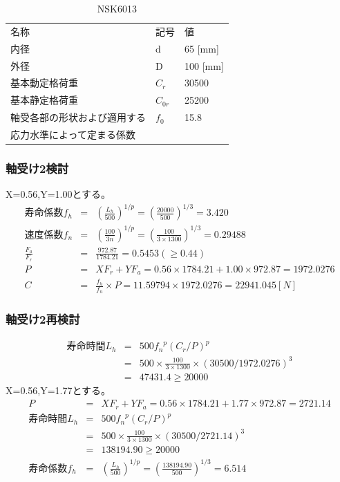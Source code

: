 \documentclass[a4j,twoside,openright,11pt]{jreport}
\begin{document}
\begin{table}[htb]
\begin{center}
  \caption{NSK6013}
  \begin{tabular}{lll} \hline
名称&記号&値\\
内径& d &65 [mm]\\
外径& D &100 [mm]\\
基本動定格荷重&$C_{r}$&30500\\
基本静定格荷重&$C_{0r}$&25200\\
軸受各部の形状および適用する&$f_0$&15.8\\
応力水準によって定まる係数&&\\
\hline
  \end{tabular}
\end{center}
\end{table}


\subsubsection{軸受け2検討}
X=0.56,Y=1.00とする。
\begin{eqnarray}
寿命係数f_h &=& \left( \frac{L_h}{500} \right)^{1/p} = \left( \frac{20000}{500} \right)^{1/3} = 3.420\\
速度係数f_n &=& \left( \frac{100}{3n} \right)^{1/p} = \left( \frac{100}{3 \times 1300} \right)^{1/3} = 0.29488\\
\frac{F_a}{F_r} &=& \frac{972.87}{1784.21} = 0.5453(\geq 0.44)\\
P &=& XF_r+YF_a = 0.56 \times 1784.21 + 1.00 \times 972.87 = 1972.0276\\
C &=& \frac{f_h}{f_n} \times P = 11.59794 \times 1972.0276 = 22941.045[N]
\end{eqnarray}

\subsubsection{軸受け2再検討}
\begin{eqnarray}
寿命時間L_h &=& 500{f_n}^p(C_r/P)^p\\
           &=& 500 \times \frac{100}{3 \times 1300} \times (30500/1972.0276)^3\\
           &=& 47431.4 \geq 20000
\end{eqnarray}
X=0.56,Y=1.77とする。
\begin{eqnarray}
P &=& XF_r+YF_a = 0.56 \times 1784.21 + 1.77 \times 972.87 = 2721.14\\
寿命時間L_h &=& 500{f_n}^p(C_r/P)^p\\
           &=& 500 \times \frac{100}{3 \times 1300} \times (30500/2721.14)^3\\
           &=& 138194.90 \geq 20000\\
寿命係数f_h &=& \left( \frac{L_h}{500} \right)^{1/p} = \left( \frac{138194.90}{500} \right)^{1/3} = 6.514
\end{eqnarray}
\end{document}

